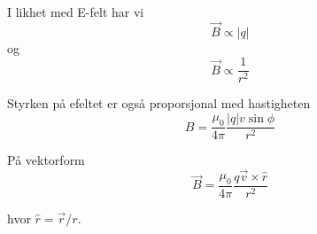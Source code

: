 I likhet med E-felt har vi
$$\vec{B} \propto |q|$$
og
$$\vec{B} \propto \frac{1}{r^2}$$

Styrken på efeltet er også proporsjonal med hastigheten
$$B = \frac{\mu_0}{4\pi} \frac{|q| v \sin{\phi}}{r^2}$$

På vektorform
$$\vec{B} = \frac{\mu_0}{4\pi} \frac{q\vec{v}\times\hat{r}}{r^2}$$

hvor $\hat{r} = \vec{r}/r$.
